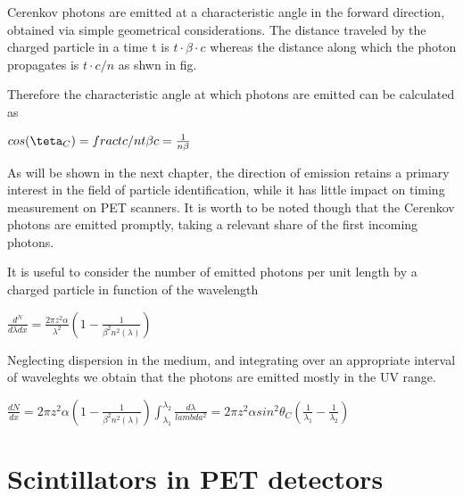 Cerenkov photons are emitted at a characteristic angle in the forward direction, obtained via simple geometrical considerations. The distance traveled by the charged particle in a time t is $t\cdot \beta \cdot c$ whereas the distance along which the photon propagates is $t\cdot c /n$ as shwn in fig.

Therefore the characteristic angle at which photons are emitted can be calculated as

$cos(\teta _{C}) = frac{t c/n}{t \beta c} = \frac{1}{n\beta}$

As will be shown in the next chapter, the direction of emission retains a primary interest in the field of particle identification, while it has little impact on timing measurement on PET scanners. It is worth to be noted though that the Cerenkov photons are emitted promptly, taking a relevant share of the first incoming photons.  

It is useful to consider the number of emitted photons per unit length by a charged particle in function of the wavelength

$\frac{d^N}{d\lambda dx} = \frac{2\pi z^{2}\alpha}{\lambda ^{2}}\left( 1 - \frac{1}{\beta ^{2}n^{2}(\lambda)} \right)$

Neglecting dispersion in the medium, and integrating over an appropriate interval of waveleghts we obtain that the photons are emitted mostly in the UV range.

$\frac{dN}{dx} = 2\pi z^{2} \alpha \left( 1-\frac{1}{\beta ^{2} n^{2} (\lambda)}\right) \int _{\lambda _{1}} ^{\lambda _{2}} \frac{d\lambda}{lambda ^{2}}  = 2\pi z^{2}\alpha sin^{2}\theta _{C} \left( \frac{1}{\lambda _{1}}-\frac{1}{\lambda _{2}}\right)$

\section{Scintillators in PET detectors}



